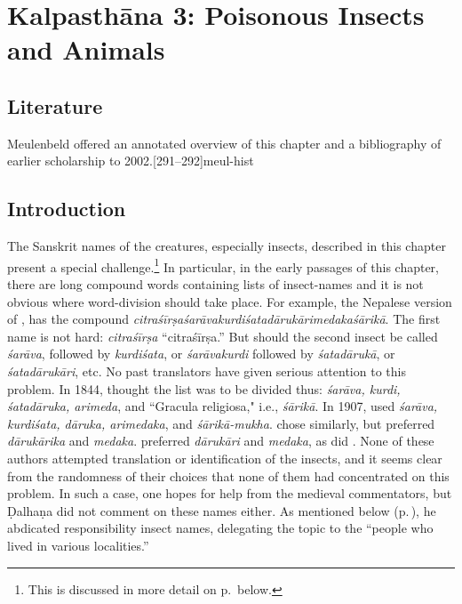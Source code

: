 \chapter{Kalpasthāna 3: Poisonous Insects and Animals}

\section{Literature}

Meulenbeld offered an annotated overview of this chapter and a
bibliography of earlier scholarship to
2002.[291--292]{meul-hist}

\section{Introduction}

The Sanskrit names of the creatures, especially insects, described in
this chapter present a special challenge.\footnote{This is discussed
    in more detail on p.\,\pageref{insectnames} below.}  In particular, in
    the early passages of this chapter, there are long compound words
    containing lists of insect-names and it is not obvious where
    word-division should take place.  For example, the Nepalese version of
    , has the compound
    \emph{citra\-śīrṣa\-śarāva\-kurdi\-śata\-dāru\-kāri\-medaka\-śārikā}.
    The first name is not hard: \emph{citraśīrṣa} “\Gls{citraśīrṣa}.”  But
    should the second insect be called \emph{śarāva}, followed by
    \emph{kurdiśata}, or \emph{śarāvakurdi} followed by \emph{śatadārukā},
    or \emph{śatadārukāri}, etc.  No past translators have given serious
    attention to this problem.  In 1844, \citet[219]{hess-1855} thought
    the list was to be divided thus: \emph{śarāva, kurdi, śatadāruka,
        arimeda}, and “Gracula religiosa," i.e., \emph{śārikā}. %
    In 1907, \citet[v.\,2, 696]{bhis-1907} used \emph{śarāva,
        kurdiśata, dāruka, arimedaka}, and \emph{śārikā-mukha}. 
    \citet[56]{sing-1976} chose similarly, but preferred
    \emph{dārukārika} and \emph{medaka}. \citet[v.\,3, 27]{shar-1999}
    preferred \emph{dārukāri} and \emph{medaka}, as did
    \citet[608]{vali-2007}.  None of these authors attempted
    translation or identification of the insects, and it seems clear
    from the randomness of their choices that none of them had
    concentrated on this problem.  In such a case, one hopes for help
    from the medieval commentators, but Ḍalhaṇa did not comment on
    these names either.  As mentioned below
    (p.\,\pageref{insectnames}), he abdicated responsibility insect
    names, delegating the topic to the “people who lived in various
    localities.”
    
